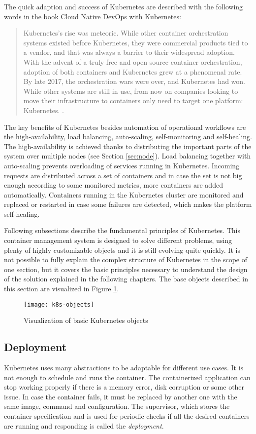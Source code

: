 \documentclass[
  digital, %
  twoside, %
  table,   %
  nolof,   %
  nolot,   %
]{fithesis3}
\begin{document}
The quick adaption and success of Kubernetes are described with the following words in the book Cloud Native DevOps with Kubernetes:
\begin{quote}
Kubernetes’s rise was meteoric. While other container orchestration systems existed
before Kubernetes, they were commercial products tied to a vendor, and that was
always a barrier to their widespread adoption. With the advent of a truly free and
open source container orchestration, adoption of both containers and Kubernetes grew
at a phenomenal rate.
By late 2017, the orchestration wars were over, and Kubernetes had won. While other
systems are still in use, from now on companies looking to move their infrastructure
to containers only need to target one platform: Kubernetes. \cite[p. 11]{k8s}.
\end{quote}

The key benefits of Kubernetes \cite{k8s_features} besides automation of operational workflows are the high-availability, load balancing, auto-scaling, self-monitoring and self-healing. The high-availability is achieved thanks to distributing the important parts of the system over multiple nodes (see Section \ref{sec:node}). Load balancing together with auto-scaling prevents overloading of services running in Kubernetes. Incoming requests are distributed across a set of containers and in case the set is not big enough according to some monitored metrics, more containers are added automatically. Containers running in the Kubernetes cluster are monitored and replaced or restarted in case some failures are detected, which makes the platform self-healing.

Following subsections describe the fundamental principles of Kubernetes. This container management system is designed to solve different problems, using plenty of highly customizable objects and it is still evolving quite quickly. It is not possible to fully explain the complex structure of Kubernetes in the scope of one section, but it covers the basic principles necessary to understand the design of the solution explained in the following chapters. The base objects described in this section are visualized in Figure \ref{fig:k8s_objects}.


\begin{figure}[H]
\caption{Visualization of basic Kubernetes objects}
\centering
\texttt{[image: k8s-objects]}
\label{fig:k8s_objects}
\end{figure}

\subsection{Deployment} \label{sec:deployment}
Kubernetes uses many abstractions to be adaptable for different use cases. It is not enough to schedule and runs the container. The containerized application can stop working properly if there is a memory error, disk corruption or some other issue. In case the container fails, it must be replaced by another one with the same image, command and configuration. The supervisor, which stores the container specification and is used for periodic checks if all the desired containers are running and responding is called the \textit{deployment}.
\end{document}
